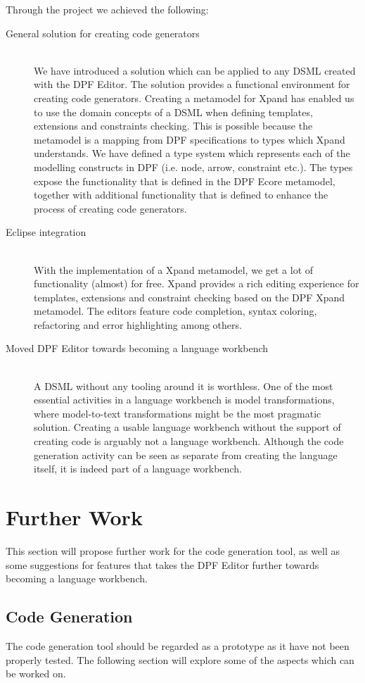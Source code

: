 Through the project we achieved the following:
\begin{description}
  \item[General solution for creating code generators] \hfill \\
  We have introduced a solution which can be applied to any DSML created with the DPF Editor. The solution provides a functional environment for creating code generators. Creating a metamodel for Xpand has enabled us to use the domain concepts of a DSML when defining templates, extensions and constraints checking. This is possible because the metamodel is a mapping from DPF specifications to types which Xpand understands. We have defined a type system which represents each of the modelling constructs in DPF (i.e. node, arrow, constraint etc.). The types expose the functionality that is defined in the DPF Ecore metamodel, together with additional functionality that is defined to enhance the process of creating code generators.
  \item[Eclipse integration] \hfill \\
  With the implementation of a Xpand metamodel, we get a lot of functionality (almost) for free. Xpand provides a rich editing experience for templates, extensions and constraint checking based on the DPF Xpand metamodel. The editors feature code completion, syntax coloring, refactoring and error highlighting among others.
  \item[Moved DPF Editor towards becoming a language workbench] \hfill \\
  A DSML without any tooling around it is worthless. One of the most essential activities in a language workbench is model transformations, where model-to-text transformations might be the most pragmatic solution. Creating a usable language workbench without the support of creating code is arguably not a language workbench. Although the code generation activity can be seen as separate from creating the language itself, it is indeed part of a language workbench.
\end{description}

\section{Further Work}
This section will propose further work for the code generation tool, as well as some suggestions for features that takes the DPF Editor further towards becoming a language workbench.

\subsection{Code Generation}
The code generation tool should be regarded as a prototype as it have not been properly tested. The following section will explore some of the aspects which can be worked on.

